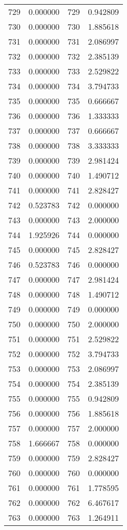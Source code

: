 \documentclass[12pt]{article}
\begin{document}
\begin{longtable}{@{}cccc@{}}
729 & 0.000000 & 729 & 0.942809 \\
730 & 0.000000 & 730 & 1.885618 \\
731 & 0.000000 & 731 & 2.086997 \\
732 & 0.000000 & 732 & 2.385139 \\
733 & 0.000000 & 733 & 2.529822 \\
734 & 0.000000 & 734 & 3.794733 \\
735 & 0.000000 & 735 & 0.666667 \\
736 & 0.000000 & 736 & 1.333333 \\
737 & 0.000000 & 737 & 0.666667 \\
738 & 0.000000 & 738 & 3.333333 \\
739 & 0.000000 & 739 & 2.981424 \\
740 & 0.000000 & 740 & 1.490712 \\
741 & 0.000000 & 741 & 2.828427 \\
742 & 0.523783 & 742 & 0.000000 \\
743 & 0.000000 & 743 & 2.000000 \\
744 & 1.925926 & 744 & 0.000000 \\
745 & 0.000000 & 745 & 2.828427 \\
746 & 0.523783 & 746 & 0.000000 \\
747 & 0.000000 & 747 & 2.981424 \\
748 & 0.000000 & 748 & 1.490712 \\
749 & 0.000000 & 749 & 0.000000 \\
750 & 0.000000 & 750 & 2.000000 \\
751 & 0.000000 & 751 & 2.529822 \\
752 & 0.000000 & 752 & 3.794733 \\
753 & 0.000000 & 753 & 2.086997 \\
754 & 0.000000 & 754 & 2.385139 \\
755 & 0.000000 & 755 & 0.942809 \\
756 & 0.000000 & 756 & 1.885618 \\
757 & 0.000000 & 757 & 2.000000 \\
758 & 1.666667 & 758 & 0.000000 \\
759 & 0.000000 & 759 & 2.828427 \\
760 & 0.000000 & 760 & 0.000000 \\
761 & 0.000000 & 761 & 1.778595 \\
762 & 0.000000 & 762 & 6.467617 \\
763 & 0.000000 & 763 & 1.264911 \\

\end{longtable}
\end{document}
